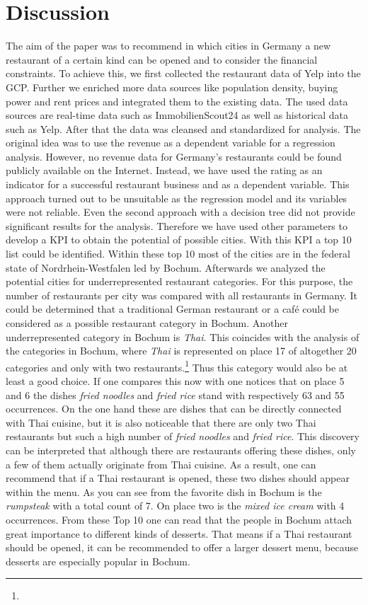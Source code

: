 \section{Discussion}
\label{sec:discussion}
The aim of the paper was to recommend in which cities in Germany a new restaurant of a certain kind can be opened and to consider the financial constraints. To achieve this, we first collected the restaurant data of Yelp into the \ac{GCP}. Further we enriched more data sources like population density, buying power and rent prices and integrated them to the existing data. The used data sources are real-time data such as ImmobilienScout24 as well as historical data such as Yelp. After that the data was cleansed and standardized for analysis. The original idea was to use the revenue as a dependent variable for a regression analysis. However, no revenue data for Germany's restaurants could be found publicly available on the Internet. Instead, we have used the rating as an indicator for a successful restaurant business and as a dependent variable. This approach turned out to be unsuitable as the regression model and its variables were not reliable. Even the second approach with a decision tree did not provide significant results for the analysis. Therefore we have used other parameters to develop a \ac{KPI} to obtain the potential of possible cities. With this \ac{KPI} a top 10 list could be identified. Within these top 10 most of the cities are in the federal state of Nordrhein-Westfalen led by Bochum. Afterwards we analyzed the potential cities for underrepresented restaurant categories. For this purpose, the number of restaurants per city was compared with all restaurants in Germany. 
It could be determined that a traditional German restaurant or a café could be considered as a possible restaurant category in Bochum. Another underrepresented category in Bochum is \textit{Thai}. This coincides with the analysis of the categories in Bochum, where \textit{Thai} is represented on place 17 of altogether 20 categories and only with two restaurants.\footnote{} Thus this category would also be at least a good choice. If one compares this now with  one notices that on place 5 and 6 the dishes \textit{fried noodles} and \textit{fried rice} stand with respectively 63 and 55 occurrences. On the one hand these are dishes that can be directly connected with Thai cuisine, but it is also noticeable that there are only two Thai restaurants but such a high number of \textit{fried noodles} and \textit{fried rice}. This discovery can be interpreted that although there are restaurants offering these dishes, only a few of them actually originate from Thai cuisine. As a result, one can recommend that if a Thai restaurant is opened, these two dishes should appear within the menu. As you can see from  the favorite dish in Bochum is the \textit{rumpsteak} with a total count of 7. On place two is the \textit{mixed ice cream} with 4 occurrences. From these Top 10 one can read that the people in Bochum attach great importance to different kinds of desserts. That means if a Thai restaurant should be opened, it can be recommended to offer a larger dessert menu, because desserts are especially popular in Bochum.
